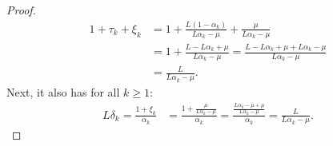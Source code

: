 \documentclass[12pt]{article}
\begin{document}
\begin{proof}
            \begin{align*}
                1 + \tau_k + \xi_k &=
                1 + \frac{L(1 - \alpha_k)}{L \alpha_k - \mu}
                + \frac{\mu}{L \alpha_k - \mu}
                \\
                &=
                1 + \frac{L - L \alpha_k + \mu}{L\alpha_k - \mu}
                =
                \frac{L - L \alpha_k + \mu + L \alpha_k - \mu}{L\alpha_k - \mu}
                \\
                &= \frac{L}{L\alpha_k - \mu}.
            \end{align*}
            Next, it also has for all $k \ge 1$:
            \begin{align*}
                L\delta_k = \frac{1 + \xi_k}{\alpha_k}
                &=
                \frac{1 + \frac{\mu}{L\alpha_k - \mu}}{\alpha_k}
                =
                \frac{\frac{L\alpha_k - \mu + \mu}{L \alpha_k - \mu}}{\alpha_k}
                =
                \frac{L}{L\alpha_k - \mu}.
            \end{align*}

        \end{proof}
\end{document}
